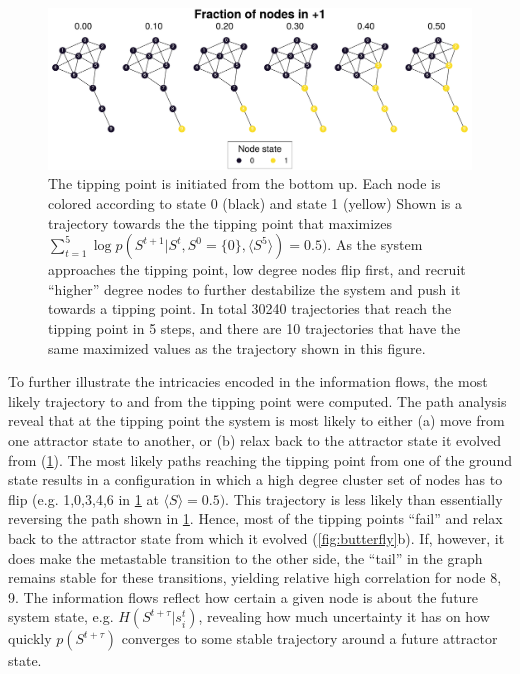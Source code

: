 \documentclass[a4paper, 11pt, twocolumn]{article}
\begin{document}
\begin{figure}
\centering
\includegraphics[width=.9\linewidth]{./figures/kite_maximized_trajectory_30230.pdf}
\caption{\label{fig:max_trajectory}The tipping point is initiated from the bottom up. Each node is colored according to state 0 (black) and state 1 (yellow) Shown is a trajectory towards the the tipping point that maximizes \(\sum_{{t=1}}^{{5}} \log p(S^{{t+1}} | S^t, S^0 =\{0\}, \langle S^5 \rangle ) = 0.5)\). As the system approaches the tipping point, low degree nodes flip first, and recruit ``higher'' degree nodes to further destabilize the system and push it towards a tipping point. In total 30240 trajectories that reach the tipping point in 5 steps, and there are 10 trajectories that have the same maximized values as the trajectory shown in this figure.}
\end{figure}

To  further  illustrate  the   intricacies  encoded  in  the
information flows,  the most  likely trajectory to  and from
the tipping  point were  computed. The path  analysis reveal
that  at the  tipping point  the  system is  most likely  to
either (a) move from one  attractor state to another, or (b)
relax  back   to  the   attractor  state  it   evolved  from
(\cref{fig:max_trajectory}). The most  likely paths reaching
the tipping point from one of  the ground state results in a
configuration in  which a high  degree cluster set  of nodes
has to flip (e.g.  1,0,3,4,6 in \cref{fig:max_trajectory} at
\(\langle  S \rangle  =  0.5)\).  This trajectory  is  less likely  than
essentially     reversing     the      path     shown     in
\cref{fig:max_trajectory}. Hence, most of the tipping points
``fail'' and relax  back to the attractor state  from which it
evolved (\cref{fig:butterfly}{b}). If, however, it does make
the metastable transition  to the other side,  the ``tail'' in
the  graph remains  stable for  these transitions,  yielding
relative  high correlation  for node  8, 9.  The information
flows reflect how  certain a given node is  about the future
system state, e.g. \(H(S^{t + \tau} | s_i^{t})\), revealing how
much  uncertainty it  has on  how quickly  \(p(S^{t +  \tau})\)
converges  to   some  stable  trajectory  around   a  future
attractor state.
\end{document}
